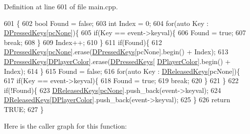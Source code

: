 Definition at line 601 of file main.\+cpp.


\begin{DoxyCode}
601                                                                                          \{
602     \textcolor{keywordtype}{bool} Found = \textcolor{keyword}{false};
603     \textcolor{keywordtype}{int} Index = 0;
604     \textcolor{keywordflow}{for}(\textcolor{keyword}{auto} Key : \hyperlink{classCApplicationData_ac6f50c764f7561c0bd2a9fbce55b2701}{DPressedKeys}[\hyperlink{GameDataTypes_8h_aafb0ca75933357ff28a6d7efbdd7602fa88767aa8e02c7b3192bbab4127b3d729}{pcNone}])\{
605         \textcolor{keywordflow}{if}(Key == event->keyval)\{
606             Found = \textcolor{keyword}{true};
607             \textcolor{keywordflow}{break};
608         \}
609         Index++;
610     \}
611     \textcolor{keywordflow}{if}(Found)\{
612         \hyperlink{classCApplicationData_ac6f50c764f7561c0bd2a9fbce55b2701}{DPressedKeys}[\hyperlink{GameDataTypes_8h_aafb0ca75933357ff28a6d7efbdd7602fa88767aa8e02c7b3192bbab4127b3d729}{pcNone}].erase(\hyperlink{classCApplicationData_ac6f50c764f7561c0bd2a9fbce55b2701}{DPressedKeys}[pcNone].begin() + Index);
613         \hyperlink{classCApplicationData_ac6f50c764f7561c0bd2a9fbce55b2701}{DPressedKeys}[\hyperlink{classCApplicationData_a53550939b20cba70570f113e4d1c5d02}{DPlayerColor}].erase(\hyperlink{classCApplicationData_ac6f50c764f7561c0bd2a9fbce55b2701}{DPressedKeys}[
      \hyperlink{classCApplicationData_a53550939b20cba70570f113e4d1c5d02}{DPlayerColor}].begin() + Index);
614     \}
615     Found = \textcolor{keyword}{false};
616     \textcolor{keywordflow}{for}(\textcolor{keyword}{auto} Key : \hyperlink{classCApplicationData_adcef59167cadd8ee516884a7c0df08f6}{DReleasedKeys}[pcNone])\{
617         \textcolor{keywordflow}{if}(Key == event->keyval)\{
618             Found = \textcolor{keyword}{true};
619             \textcolor{keywordflow}{break};
620         \}
621     \}
622     \textcolor{keywordflow}{if}(!Found)\{
623         \hyperlink{classCApplicationData_adcef59167cadd8ee516884a7c0df08f6}{DReleasedKeys}[\hyperlink{GameDataTypes_8h_aafb0ca75933357ff28a6d7efbdd7602fa88767aa8e02c7b3192bbab4127b3d729}{pcNone}].push\_back(event->keyval);
624         \hyperlink{classCApplicationData_adcef59167cadd8ee516884a7c0df08f6}{DReleasedKeys}[\hyperlink{classCApplicationData_a53550939b20cba70570f113e4d1c5d02}{DPlayerColor}].push\_back(event->keyval);
625     \}
626     \textcolor{keywordflow}{return} TRUE;
627 \}
\end{DoxyCode}
Here is the caller graph for this function\+:
